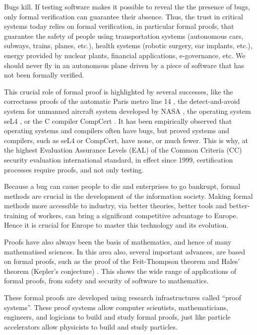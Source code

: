 \thispagestyle{empty}


Bugs kill.  If testing software makes it possible to reveal the the
presence of bugs, only formal verification can guarantee their
absence.  Thus, the trust in critical systems today relies on formal
verification, in particular formal proofs, that guarantee the safety
of people using transportation systems (autonomous cars, subways,
trains, planes, etc.), health systems (robotic surgery, ear implants,
etc.), energy provided by nuclear plants, financial applications,
e-governance, etc.  We should never fly in an autonomous plane driven
by a piece of software that has not been formally verified.


This crucial role of formal proof is highlighted by several successes,
like the correctness proofs of the automatic Paris metro line 14
\cite{Behm98,Lecomte17}, the detect-and-avoid system for unmanned aircraft
system developed by NASA \cite{Munoz16}, the operating system seL4
\cite{Klein09}, or the C compiler CompCert \cite{Leroy06}.
It has
been empirically observed that operating systems and compilers
often
have bugs, but proved systems and compilers, such as seL4 or CompCert, have
none, or
much fewer.  This is why, at the highest Evaluation Assurance Levels (EAL)
of the Common Criteria (CC) security evaluation international standard, in
effect since 1999, certification processes require proofs, and not
only testing.


Because a bug can cause people to die and enterprises to go bankrupt,
formal methods are crucial in the development of the information
society. Making formal methods more accessible to industry, via
better theories, better tools and better-training of workers, can
bring a significant competitive advantage to Europe.  Hence it is
crucial for Europe to master this technology and its evolution.

Proofs have also always been the basis of mathematics, and hence of
many mathematised sciences. In this area also, several important
advances, are based on formal proofs, such as the proof of the
Feit-Thompson theorem \cite{Gonthier13} and Hales' theorem (Kepler's
conjecture) \cite{Hales17}. This shows the wide range of applications of
formal proofs, from safety and security of software to mathematics.

These formal proofs are developed using research infrastructures called
``proof systems''.  These proof systems allow computer scientists,
mathematicians, engineers, and logicians to build and study formal
proofs, just like particle accelerators allow physicists to build and
study particles.


